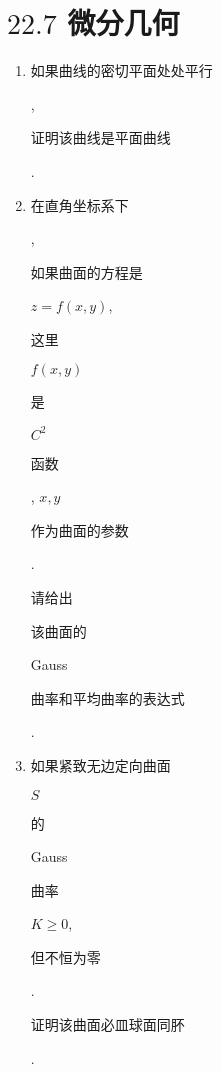 \documentclass[10pt]{article}
\begin{document}
\section{$22.7$ 微分几何}
\begin{enumerate}
  \item \begin{CJK}{UTF8}{mj}如果曲线的密切平面处处平行\end{CJK}, \begin{CJK}{UTF8}{mj}证明该曲线是平面曲线\end{CJK}.

  \item \begin{CJK}{UTF8}{mj}在直角坐标系下\end{CJK}, \begin{CJK}{UTF8}{mj}如果曲面的方程是\end{CJK} $z=f(x, y)$, \begin{CJK}{UTF8}{mj}这里\end{CJK} $f(x, y)$ \begin{CJK}{UTF8}{mj}是\end{CJK} $C^{2}$ \begin{CJK}{UTF8}{mj}函数\end{CJK}, $x, y$ \begin{CJK}{UTF8}{mj}作为曲面的参数\end{CJK}. \begin{CJK}{UTF8}{mj}请给出\end{CJK} \begin{CJK}{UTF8}{mj}该曲面的\end{CJK} Gauss \begin{CJK}{UTF8}{mj}曲率和平均曲率的表达式\end{CJK}.

  \item \begin{CJK}{UTF8}{mj}如果紧致无边定向曲面\end{CJK} $S$ \begin{CJK}{UTF8}{mj}的\end{CJK} Gauss \begin{CJK}{UTF8}{mj}曲率\end{CJK} $K \geqslant 0$, \begin{CJK}{UTF8}{mj}但不恒为零\end{CJK}. \begin{CJK}{UTF8}{mj}证明该曲面必皿球面同肧\end{CJK}.

\end{enumerate}
\end{document}
